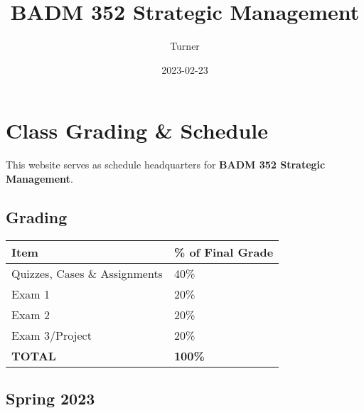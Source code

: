 \documentclass[
]{book}
\title{BADM 352 Strategic Management}
\author{Turner}
\date{2023-02-23}
\begin{document}
\maketitle

{
\setcounter{tocdepth}{1}
\tableofcontents
}
\hypertarget{class-grading-schedule}{%
\chapter*{Class Grading \& Schedule}\label{class-grading-schedule}}

This website serves as schedule headquarters for \textbf{BADM 352 Strategic Management}.

\hypertarget{grading}{%
\section*{Grading}\label{grading}}

\begin{longtable}[]{@{}ll@{}}
\toprule()
Item & \% of Final Grade \\
\midrule()
\endhead
Quizzes, Cases \& Assignments & 40\% \\
Exam 1 & 20\% \\
Exam 2 & 20\% \\
Exam 3/Project & 20\% \\
\textbf{TOTAL} & \textbf{100\%} \\
\bottomrule()
\end{longtable}

\hypertarget{spring-2023}{%
\section*{Spring 2023}\label{spring-2023}}
\end{document}
